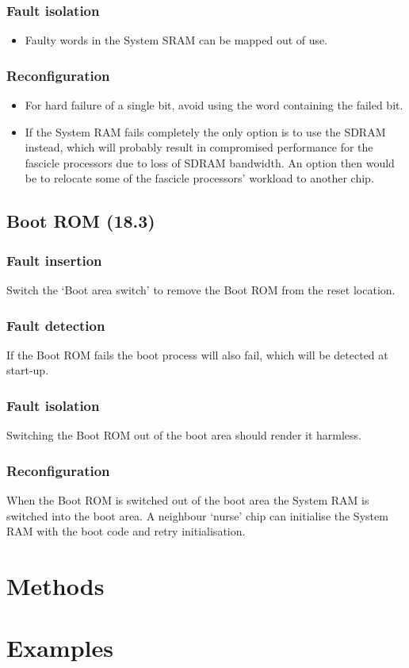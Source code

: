 \documentclass[11pt]{article}
\newenvironment{itmz}{
	\begin{itemize}
		\setlength{\itemsep}{0pt}
		\setlength{\parskip}{0pt}
	}{\end{itemize}}
\begin{document}
\subsubsection*{Fault isolation}
\begin{itmz}
\item Faulty words in the System SRAM can be mapped out of use.
\end{itmz}
\subsubsection*{Reconfiguration}
\begin{itmz}
\item For hard failure of a single bit, avoid using the word containing the failed bit.
\item If the System RAM fails completely the only option is to use the SDRAM instead, which will
probably result in compromised performance for the fascicle processors due to loss of SDRAM
bandwidth. An option then would be to relocate some of the fascicle processors' workload to
another chip.
\end{itmz}

\subsection{Boot ROM (18.3)}
\subsubsection*{Fault insertion}
Switch the `Boot area switch' to remove the Boot ROM from the reset location.
\subsubsection*{Fault detection}
If the Boot ROM fails the boot process will also fail, which will be detected at start-up.
\subsubsection*{Fault isolation}
Switching the Boot ROM out of the boot area should render it harmless.
\subsubsection*{Reconfiguration}
When the Boot ROM is switched out of the boot area the System RAM is switched into the boot
area. A neighbour `nurse' chip can initialise the System RAM with the boot code and retry
initialisation.

\section{Methods}

\section{Examples}
\end{document}
